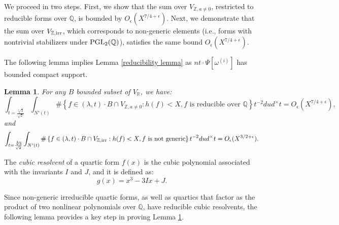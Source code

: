 \documentclass{article}
\def\PGL{{\rm PGL}}
\def\irr{{\rm irr}}
\newtheorem{lemma}[theorem]{Lemma}
\def \dw{{t^{-2}dud^\times t  }}
\begin{document}
We proceed in two steps. First, we show that the sum over $V_{\mathbb{Z}, a \neq 0}$, restricted to reducible forms over $\mathbb{Q}$, is bounded by $O_{\epsilon}(X^{7/4+\epsilon})$. Next, we demonstrate that the sum over $V_{\mathbb{Z}, \irr}$, which corresponds to non-generic elements (i.e., forms with nontrivial stabilizers under $\PGL_2(\mathbb{Q})$), satisfies the same bound $O_{\epsilon}(X^{7/4+\epsilon})$.

The following lemma implies Lemma \ref{reducibility lemma} as $nt\cdot \Psi[\omega^{(i)}]$ has bounded compact support.

\begin{lemma}\label{lemma for reducibility lemma} For any $B$ bounded subset of $V_{\mathbb{R}}$, we have:
\begin{equation}\label{reducible}
\int_{t = \frac{\sqrt[4]{3}}{\sqrt{2}}} \int_{N'(t)}   \#\left\{ f \in (\lambda, t) \cdot B \cap V_{\mathbb{Z}, a \neq 0} : h(f) < X, f \text{ is reducible over } \mathbb{Q} \right\} \dw = O_{\epsilon}(X^{7/4+\epsilon}), \end{equation} and
\begin{equation} \label{generic}
\int_{t = \frac{\sqrt[4]{3}}{\sqrt{2}}} \int_{N'(t)} \#\left\{ f \in (\lambda, t) \cdot B \cap V_{\mathbb{Z}, \irr} : h(f) < X, f \text{ is not generic} \right\} \dw = O_{\epsilon}(X^{3/2+\epsilon}). \end{equation} \end{lemma}
 

The \textit{cubic resolvent} of a quartic form $f(x)$ is the cubic polynomial associated with the invariants $I$ and $J$, and it is defined as:
\begin{equation*}
    g(x) = x^3 - 3Ix + J.
\end{equation*}


Since non-generic irreducible quartic forms, as well as quartics that factor as the product of two nonlinear polynomials over $\mathbb{Q}$, have reducible cubic resolvents, the following lemma provides a key step in proving Lemma \ref{lemma for reducibility lemma}.
\end{document}
